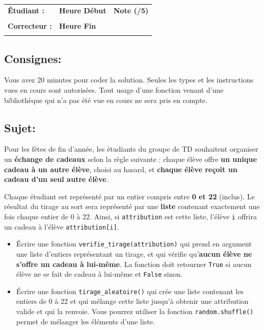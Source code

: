 \documentclass[a4paper,11pt]{article}
\begin{document}
\begin{table}[h!]
\centering
\renewcommand{\arraystretch}{1.4} %
\begin{tabular}{|p{10cm}|p{3cm}|p{2cm}|}
\hline
\textbf{Étudiant :} & \textbf{Heure Début }  & \textbf{Note (/5) }  \\
& & \\
\hline
\textbf{Correcteur :} & \textbf{Heure Fin } & \\
& & \\
\hline

\hline
\end{tabular}
\end{table}

\vspace*{-0.4 cm}
\subsection*{Consignes:} Vous avez 20 minutes pour coder la solution. Seules les types et les instructions vues en cours sont autorisées. Tout usage d'une fonction 
venant d'une bibliothèque qui n'a pas été vue en cours ne sera pris en compte. 

\vspace*{-0.2 cm}

\subsection*{Sujet:}   Pour les fêtes de fin d’année, les étudiants du groupe de TD souhaitent organiser un \textbf{échange de cadeaux} selon la règle suivante :  
chaque élève offre \textbf{un unique cadeau à un autre élève}, choisi au hasard, et \textbf{chaque élève reçoit un cadeau d’un seul autre élève}.

\medskip

Chaque étudiant est représenté par un entier compris entre \textbf{0 et 22} (inclus).  
Le résultat du tirage au sort sera représenté par une \textbf{liste} contenant exactement une fois chaque entier de 0 à 22.  
Ainsi, si \texttt{attribution} est cette liste, l’élève \texttt{i} offrira un cadeau à l’élève \texttt{attribution[i]}.

\begin{itemize}
\item[1.]  Écrire une fonction \texttt{verifie\_tirage(attribution)} qui prend en argument une liste d’entiers représentant un tirage, et qui vérifie qu’\textbf{aucun élève ne s’offre un cadeau à lui-même}.  La fonction doit retourner \texttt{True} si aucun élève ne se fait de cadeau à lui-même et \texttt{False} sinon.
\item[2.] Écrire une fonction \texttt{tirage\_aleatoire()} qui crée une liste contenant les entiers de 0 à 22 et qui mélange cette liste jusqu'à obtenir une attribution valide et qui la renvoie. Vous pourrez utiliser la fonction \texttt{random.shuffle()} permet de mélanger les éléments d'une liste.
\end{itemize}
\end{document}
